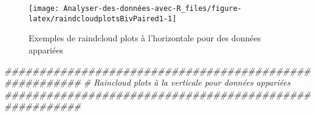 \documentclass[
  french,
]{book}
\newenvironment{Shaded}{\begin{snugshade}}{\end{snugshade}}
\newcommand{\CommentTok}[1]{\textcolor[rgb]{0.56,0.35,0.01}{\textit{#1}}}
\begin{document}
\begin{figure}

{\centering \texttt{[image: Analyser-des-données-avec-R\_files/figure-latex/raindcloudplotsBivPaired1-1]} 

}

\caption{Exemples de raindcloud plots à l'horizontale  pour des données appariées}\label{fig:raindcloudplotsBivPaired1}
\end{figure}

\begin{Shaded}
\begin{Highlighting}[]
\CommentTok{#######################################################}
\CommentTok{# Raincloud plots à la verticale pour données appariées}
\CommentTok{#######################################################}


\end{Highlighting}
\end{Shaded}
\end{document}
